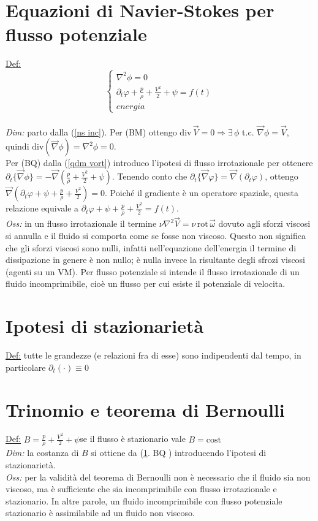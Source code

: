 \documentclass[11pt,a4paper]{report}
\newcommand{\sz}[1]{\scriptsize #1\normalsize}
\begin{document}
	\section{Equazioni di Navier-Stokes per flusso potenziale}	\label{ns pot}
	\underline{Def:}$$\begin{cases}\nabla^2\phi=0\\
	\partial_t\varphi+\frac{p}{\rho}+\frac{V^2}{2}+\psi=f(t)\\
	energia\end{cases}$$\\
	\textit{Dim:} parto dalla (\ref{ns inc}). Per \sz{ (BM)  } ottengo $\mathrm{div}\,\vec V=0\Rightarrow\exists\,\phi$ t.c. $\vec\nabla\phi=\vec V$, quindi $\mathrm{div}(\vec\nabla\phi)=\nabla^2\phi=0$.\\
	Per \sz{ (BQ)  } dalla (\ref{qdm vort}) introduco l'ipotesi di flusso irrotazionale per ottenere $\partial_t\{\vec\nabla\phi\}=-\vec\nabla(\frac{p}{\rho}+\frac{V^2}{2}+\psi)$. Tenendo conto che $\partial_t\{\vec\nabla\varphi\}=\vec\nabla(\partial_t\varphi)$, ottengo $\vec\nabla(\partial_t\varphi+\psi+\frac{p}{\rho}+\frac{V^2}{2})=0$. Poiché il gradiente è un operatore spaziale, questa relazione equivale a $\partial_t\varphi+\psi+\frac{p}{\rho}+\frac{V^2}{2}=f(t)$.\\
	\textit{Oss:} in un flusso irrotazionale il termine $\nu\nabla^2\vec V=\nu\,\mathrm{rot}\,\vec\omega$ dovuto agli sforzi viscosi si annulla e il fluido si comporta come se fosse non viscoso. Questo non significa che gli sforzi viscosi sono nulli, infatti nell'equazione dell'energia il termine di dissipazione in genere è non nullo; è nulla invece la risultante degli sfrozi viscosi (agenti su un VM). Per flusso potenziale si intende il flusso irrotazionale di un fluido incomprimibile, cioè un flusso per cui esiste il potenziale di velocita.
	
	\section{Ipotesi di stazionarietà}
	\underline{Def:} tutte le grandezze (e relazioni fra di esse) sono indipendenti dal tempo, in particolare $\partial_t(\cdot)\equiv 0$
	
	\section{Trinomio e teorema di Bernoulli}
	\underline{Def:} $B=\frac{p}{\rho}+\frac{V^2}{2}+\psi$\quad se il flusso è stazionario vale $B=\mathrm{cost}$\\
	\textit{Dim:} la costanza di $B$ si ottiene da (\ref{ns pot}.\sz{ BQ }) introducendo l'ipotesi di stazionarietà.\\
	\textit{Oss:} per la validità del teorema di Bernoulli non è necessario che il fluido sia non viscoso, ma è sufficiente che sia incomprimibile con flusso irrotazionale e stazionario. In altre parole, un fluido incomprimibile con flusso potenziale stazionario è assimilabile ad un fluido non viscoso.
	
\end{document}
